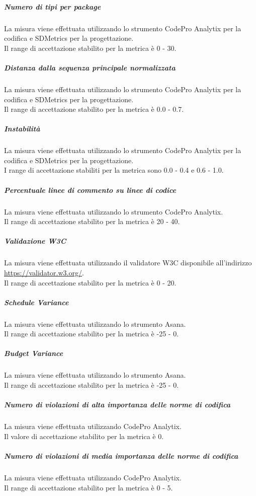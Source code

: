 			\subparagraph{Numero di tipi per package}
			La misura viene effettuata utilizzando lo strumento CodePro Analytix per la codifica e SDMetrics per la progettazione.
			\\Il range di accettazione stabilito per la metrica è 0 - 30.
			
			\subparagraph{Distanza dalla sequenza principale normalizzata}
			La misura viene effettuata utilizzando lo strumento CodePro Analytix per la codifica e SDMetrics per la progettazione.
			\\Il range di accettazione stabilito per la metrica è 0.0 - 0.7.
			
			\subparagraph{Instabilità}
			La misura viene effettuata utilizzando lo strumento CodePro Analytix per la codifica e SDMetrics per la progettazione.
			\\I range di accettazione stabiliti per la metrica sono 0.0 - 0.4 e 0.6 - 1.0.
			
			\subparagraph{Percentuale linee di commento su linee di codice}
			La misura viene effettuata utilizzando lo strumento CodePro Analytix.
			\\Il range di accettazione stabilito per la metrica è 20 - 40.
			
			\subparagraph{Validazione W3C}
			La misura viene effettuata utilizzando il validatore W3C disponibile all'indirizzo \url{https://validator.w3.org/}.
			\\Il range di accettazione stabilito per la metrica è 0 - 20.
			
			\subparagraph{Schedule Variance}
			La misura viene effettuata utilizzando lo strumento Asana.
			\\Il range di accettazione stabilito per la metrica è -25 - 0.
			
			\subparagraph{Budget Variance}
			La misura viene effettuata utilizzando lo strumento Asana.
			\\Il range di accettazione stabilito per la metrica è -25 - 0.
			
			\subparagraph{Numero di violazioni di alta importanza delle norme di codifica}
			La misura viene effettuata utilizzando CodePro Analytix.
			\\Il valore di accettazione stabilito per la metrica è 0.
			
			\subparagraph{Numero di violazioni di media importanza delle norme di codifica}
			La misura viene effettuata utilizzando CodePro Analytix.
			\\Il range di accettazione stabilito per la metrica è 0 - 5.
			
